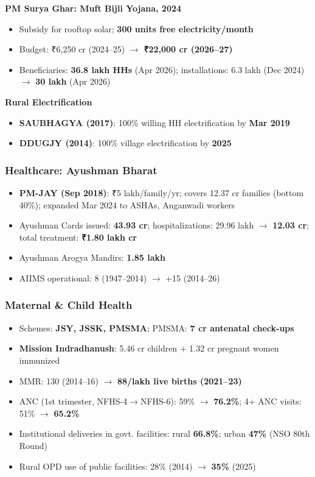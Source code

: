 \textbf{PM Surya Ghar: Muft Bijli Yojana, 2024}
\begin{itemize}
  \item Subsidy for rooftop solar; \textbf{300 units free electricity/month}
  \item Budget: ₹6,250 cr (2024--25) $\rightarrow$ \textbf{₹22,000 cr (2026--27)}
  \item Beneficiaries: \textbf{36.8 lakh HHs} (Apr 2026); installations: 6.3 lakh (Dec 2024) $\rightarrow$ \textbf{30 lakh} (Apr 2026)
\end{itemize}

\textbf{Rural Electrification}
\begin{itemize}
  \item \textbf{SAUBHAGYA (2017)}: 100\% willing HH electrification by \textbf{Mar 2019}
  \item \textbf{DDUGJY (2014)}: 100\% village electrification by \textbf{2025}
\end{itemize}

\subsubsection*{Healthcare: Ayushman Bharat}
\begin{itemize}
  \item \textbf{PM-JAY (Sep 2018)}: ₹5 lakh/family/yr; covers 12.37 cr families (bottom 40\%); expanded Mar 2024 to ASHAs, Anganwadi workers
  \item Ayushman Cards issued: \textbf{43.93 cr}; hospitalizations: 29.96 lakh $\rightarrow$ \textbf{12.03 cr}; total treatment: \textbf{₹1.80 lakh cr}
  \item Ayushman Arogya Mandirs: \textbf{1.85 lakh}
  \item AIIMS operational: 8 (1947--2014) $\rightarrow$ +15 (2014--26)
\end{itemize}

\subsubsection*{Maternal \& Child Health}
\begin{itemize}
  \item Schemes: \textbf{JSY, JSSK, PMSMA}; PMSMA: \textbf{7 cr antenatal check-ups}
  \item \textbf{Mission Indradhanush}: 5.46 cr children + 1.32 cr pregnant women immunized
  \item MMR: 130 (2014--16) $\rightarrow$ \textbf{88/lakh live births (2021--23)}
  \item ANC (1st trimester, NFHS-4$\rightarrow$NFHS-6): 59\% $\rightarrow$ \textbf{76.2\%}; 4+ ANC visits: 51\% $\rightarrow$ \textbf{65.2\%}
  \item Institutional deliveries in govt. facilities: rural \textbf{66.8\%}; urban \textbf{47\%} (NSO 80th Round)
  \item Rural OPD use of public facilities: 28\% (2014) $\rightarrow$ \textbf{35\%} (2025)
\end{itemize}

